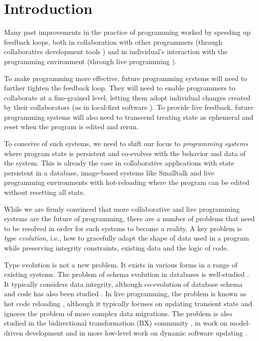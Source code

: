 \documentclass[english,submission]{programming}
\begin{document}
\section{Introduction}

Many past improvements in the practice of programming worked by speeding up feedback loops,
both in collaboration with other programmers (through collaborative development tools
\cite{ProGit, goldman2011real,kurniawan2015coder,replit}) and in individual's interaction with the
programming environment (through live programming \cite{rein2018exploratory}).

To make programming more effective, future programming systems will need to further tighten
the feedback loop. They will need to enable programmers to collaborate at a fine-grained level,
letting them adopt individual changes created by their collaborators (as in local-first software
\cite{localfirst}). To provide live feedback, future programming systems will also need to
transcend treating state as ephemeral and reset when the
program is edited and rerun.

To conceive of such systems, we need to shift our focus to \emph{programming systems} \cite{techdims}
where program state is persistent and co-evolves with the behavior and data of the system. This is
already the case in collaborative applications with state persistent in a database, image-based
systems like Smalltalk and live programming environments with hot-reloading where the program can
be edited without resetting all state.

While we are firmly convinced that more collaborative and live programming systems are the
future of programming, there are a number of problems that need to be resolved in order for
such systems to become a reality. A key problem is \emph{type evolution}, i.e., how to
gracefully adapt the shape of data used in a program while preserving integrity
constraints, existing data and the logic of code.

Type evolution is not a new problem. It exists in various forms in a range of existing systems.
The problem of schema evolution in databases is well-studied \cite{erhard06}.
It typically considers data integrity, although co-evolution of database schema
and code has also been studied \cite{Cleve2006,wang19}.
In live programming, the problem is known as hot code reloading \cite{barenz2020essence,beckmann2021shortening},
although it typically focuses on updating transient state and ignores the problem of more complex
data migrations. The problem is also studied in the bidirectional transformation (BX)
community \cite{czarnecki2009bidirectional}, in work on model-driven development
\cite{Cicchetti11,alanen2003} and in more low-level work on dynamic software updating
\cite{hicks2005dynamic}.
\end{document}
